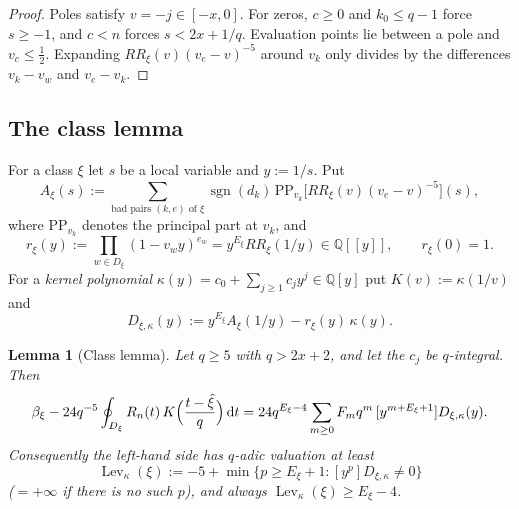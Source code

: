 \documentclass{amsart}
\newtheorem{lemma}[theorem]{Lemma}
\theoremstyle{definition}
\theoremstyle{remark}
\numberwithin{equation}{section}
\newcommand{\Q}{\mathbb{Q}}
\newcommand{\sgn}{\operatorname{sgn}}
\newcommand{\Lev}{\operatorname{Lev}}
\newcommand{\dd}{\,\mathrm{d}}
\begin{document}
\begin{proof}
Poles satisfy $v=-j\in[-x,0]$. For zeros, $c\ge0$ and $k_0\le q-1$ force
$s\ge-1$, and $c<n$ forces $s<2x+1/q$. Evaluation points lie between a pole
and $v_c\le\frac12$. Expanding $RR_\xi(v)(v_e-v)^{-5}$ around $v_k$ only
divides by the differences $v_k-v_w$ and $v_e-v_k$.
\end{proof}

\subsection{The class lemma}\label{ss:class}

For a class $\xi$ let $s$ be a local variable and $y:=1/s$. Put
\[
  A_\xi(s):=\sum_{\text{bad pairs }(k,e)\text{ of }\xi}\sgn(d_k)\,
  \mathrm{PP}_{v_k}\bigl[RR_\xi(v)(v_e-v)^{-5}\bigr](s),
\]
where $\mathrm{PP}_{v_k}$ denotes the principal part at $v_k$, and
\[
  r_\xi(y):=\prod_{w\in D_\xi}(1-v_wy)^{e_w}=y^{E_\xi}RR_\xi(1/y)\in\Q[[y]],\qquad r_\xi(0)=1 .
\]
For a \emph{kernel polynomial} $\kappa(y)=c_0+\sum_{j\ge1}c_jy^j\in\Q[y]$ put
$K(v):=\kappa(1/v)$ and
\[
  D_{\xi,\kappa}(y):=y^{E_\xi}A_\xi(1/y)-r_\xi(y)\,\kappa(y).
\]

\begin{lemma}[Class lemma]\label{lem:class}
Let $q\ge5$ with $q>2x+2$, and let the $c_j$ be $q$-integral. Then
\begin{equation}\label{eq:class}
  \beta_\xi-24q^{-5}\oint_{D_\xi}R_n(t)\,K\Bigl(\frac{t-\hat\xi}q\Bigr)\dd t
  =24q^{E_\xi-4}\sum_{m\ge0}F_mq^m\,[y^{m+E_\xi+1}]D_{\xi,\kappa}(y).
\end{equation}
Consequently the left-hand side has $q$-adic valuation at least
\[
  \Lev_\kappa(\xi):=-5+\min\{p\ge E_\xi+1:[y^p]D_{\xi,\kappa}\ne0\}
\]
($=+\infty$ if there is no such $p$), and always
$\Lev_\kappa(\xi)\ge E_\xi-4$.
\end{lemma}
\end{document}
